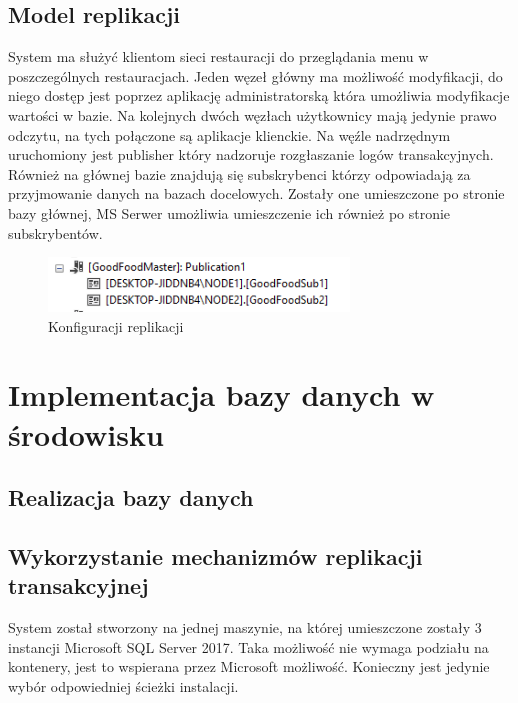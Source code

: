 \documentclass{article}
\begin{document}
	\subsection{Model replikacji}	
	System ma służyć klientom sieci restauracji do przeglądania menu w poszczególnych restauracjach. Jeden węzeł główny ma możliwość modyfikacji, do niego dostęp jest poprzez aplikację administratorską która umożliwia modyfikacje wartości w bazie. Na kolejnych dwóch węzłach użytkownicy mają jedynie prawo odczytu, na tych połączone są aplikacje klienckie. Na węźle nadrzędnym uruchomiony jest publisher który nadzoruje rozgłaszanie logów transakcyjnych. Również na głównej bazie znajdują się subskrybenci którzy odpowiadają za przyjmowanie danych na bazach docelowych. Zostały one umieszczone po stronie bazy głównej, MS Serwer umożliwia umieszczenie ich również po stronie subskrybentów.
	
	
	
	\begin{figure}[hbt!]
		\includegraphics[width=8cm]{Files/Pictures/repSub}
		\centering
		\caption{Konfiguracji replikacji}
	\end{figure}
	


\section{Implementacja bazy danych w środowisku}
	\subsection{Realizacja bazy danych}
	\newpage
	\subsection{Wykorzystanie mechanizmów replikacji transakcyjnej}
System został stworzony na jednej maszynie, na której umieszczone zostały 3 instancji Microsoft SQL Server 2017. Taka możliwość nie wymaga podziału na kontenery, jest to wspierana przez Microsoft możliwość. Konieczny jest jedynie wybór odpowiedniej ścieżki instalacji.
	
\end{document}
